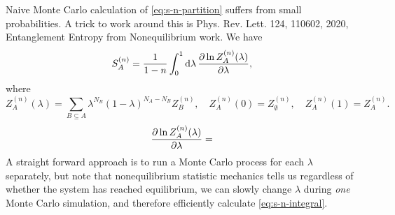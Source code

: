 \documentclass[hyperref, a4paper]{article}
\begin{document}
Naive Monte Carlo calculation of \eqref{eq:s-n-partition} suffers from small probabilities. A trick to 
work around this is Phys. Rev. Lett. 124, 110602, 2020, Entanglement Entropy from Nonequilibrium work.
We have 
\begin{equation}
    S_A^{(n)} = \frac{1}{1-n} \int_0^1 \dd{\lambda} \pdv{\ln Z_A^{(n)}(\lambda)}{\lambda},
    \label{eq:s-n-integral}
\end{equation}
where 
\begin{equation}
    Z_A^{(n)}(\lambda) = \sum_{B \subseteq A} \lambda^{N_B} (1 - \lambda)^{N_A - N_B} Z_B^{(n)}, \quad Z_A^{(n)}(0) = Z_\emptyset^{(n)}, \quad Z_A^{(n)}(1) = Z_A^{(n)}.
\end{equation}
\begin{equation}
    \pdv{\ln Z_A^{(n)}(\lambda)}{\lambda} = 
\end{equation}
A straight forward approach is to run a Monte Carlo process for each $\lambda$ separately, but note that 
nonequilibrium statistic mechanics tells us 
regardless of whether the system has reached equilibrium, we can slowly change $\lambda$ during \emph{one} 
Monte Carlo simulation, and therefore efficiently calculate \eqref{eq:s-n-integral}.
\end{document}
